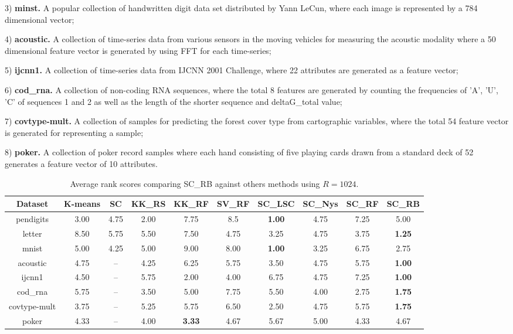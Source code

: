 \documentclass[sigconf]{acmart}
\newcommand{\1}{\boldsymbol{1}}
\newcommand{\0}{\boldsymbol{0}}
\begin{document}
3) \textbf{minst.} A popular collection of handwritten digit data set distributed by Yann LeCun, where each image is represented by a 784 dimensional vector; 

4) \textbf{acoustic.} A collection of time-series data from various sensors in the moving vehicles for measuring the acoustic modality where a 50 dimensional feature vector is generated by using FFT for each time-series; 

5) \textbf{ijcnn1.} A collection of time-series data from IJCNN 2001 Challenge, where 22 attributes are generated as a feature vector; 

6) \textbf{cod\_rna.} A collection of non-coding RNA sequences, where the total 8 features are generated by counting the frequencies of 'A', 'U', 'C' of sequences 1 and 2 as well as the length of the shorter sequence and deltaG\_total value;

7) \textbf{covtype-mult.} A collection of samples for predicting the forest cover type from cartographic variables, where the total 54 feature vector is generated for representing a sample;

8) \textbf{poker.} A collection of poker record samples where each hand consisting of five playing cards drawn from a standard deck of 52 generates a feature vector of 10 attributes.

\begin{table*}[t]
\centering
\caption{Average rank scores comparing SC\_RB against others methods using $R=1024$.}
\vspace{0mm}
\label{tb:ave_rank_alldata}
\newcommand{\Bd}[1]{\textbf{#1}}
\begin{center}
    \begin{tabular}{ c c c c c c c c c c}
    \hline
    Dataset & K-means & SC & KK\_RS & KK\_RF & SV\_RF & SC\_LSC & SC\_Nys & SC\_RF & SC\_RB \\ \hline 
    pendigits  & 3.00 & 4.75 & 2.00 & 7.75 & 8.5 & \Bd{1.00} & 4.75 & 7.25 & 5.00 \\ 
    letter	 & 8.50 & 5.75 & 5.50 & 7.50 & 4.75 & 3.25 & 4.75 & 3.75 & \Bd{1.25} \\ 
    mnist	& 5.00 & 4.25 & 5.00 & 9.00 & 8.00 & \Bd{1.00} & 3.25 & 6.75 & 2.75 \\ 
    acoustic  & 4.75 & -- & 4.25 & 6.25 & 5.75 & 3.50  & 4.75 & 5.75 & \Bd{1.00} \\ 
    ijcnn1  & 4.50 & -- & 5.75 & 2.00 & 4.00 & 6.75  & 4.75 & 7.25 & \Bd{1.00} \\ 
    cod\_rna  & 5.75 & -- & 3.50 & 5.00 & 7.75 & 5.50 & 4.00 & 2.75 & \Bd{1.75} \\ covtype-mult  & 3.75 & -- & 5.25 & 5.75 & 6.50 & 2.50 & 4.75 & 5.75 & \Bd{1.75} \\ poker  & 4.33 & -- & 4.00 & \Bd{3.33} & 4.67 & 5.67 & 5.00 & 4.33 & 4.67  \\ \hline
    \end{tabular}
\end{center}
\end{table*}
\end{document}
